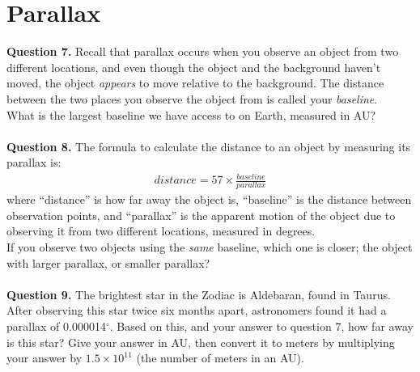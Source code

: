 \documentclass[11pt]{article}
\begin{document}
\newpage

\section{Parallax}

\textbf{Question 7.} Recall that parallax occurs when you observe an object from two different locations, and even though the object and the background haven't moved, the object \textit{appears} to move relative to the background. The distance between the two places you observe the object from is called your \textit{baseline}.\\

What is the largest baseline we have access to on Earth, measured in AU?\\

\vspace{1.5cm}
\hrulefill\\

\textbf{Question 8.} The formula to calculate the distance to an object by measuring its parallax is:
\begin{align*}
distance=57\times \frac{baseline}{parallax}
\end{align*}
where ``distance'' is how far away the object is, ``baseline'' is the distance between observation points, and ``parallax'' is the apparent motion of the object due to observing it from two different locations, measured in degrees.\\

If you observe two objects using the \textit{same} baseline, which one is closer; the object with larger parallax, or smaller parallax? \\

\vspace{1.5cm}
\hrulefill\\

\textbf{Question 9.} The brightest star in the Zodiac is Aldebaran, found in Taurus.\\ 

After observing this star twice six months apart, astronomers found it had a parallax of 0.000014$^\circ$. Based on this, and your answer to question 7, how far away is this star? Give your answer in AU, then convert it to meters by multiplying your answer by $1.5\times 10^{11}$ (the number of meters in an AU).\\

\vspace{1.5cm}
\hrulefill\\
\end{document}
